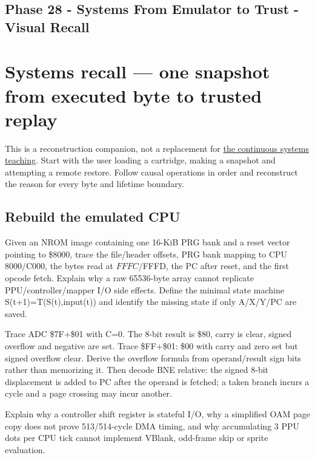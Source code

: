 \hypertarget{appendix-11f73b337e37}{}
\section*{Phase 28 - Systems From Emulator to Trust - Visual Recall}
\chapter{Systems recall --- one snapshot from executed byte to trusted replay}\label{appendix-11f73b337e37-systems-recall-one-snapshot-from-executed-byte-to-trusted-replay}

This is a reconstruction companion, not a replacement for \href{Continuous\%20Notes/Computing\%20Foundations\%20-\%20From\%20Bits\%20to\%20C++\%20and\%20Systems\%20APIs}{the continuous systems teaching}. Start with the user loading a cartridge, making a snapshot and attempting a remote restore. Follow causal operations in order and reconstruct the reason for every byte and lifetime boundary.

\section{Rebuild the emulated CPU}\label{appendix-11f73b337e37-rebuild-the-emulated-cpu}

Given an NROM image containing one 16-KiB PRG bank and a reset vector pointing to \$8000, trace the file/header offsets, PRG bank mapping to CPU \(8000/\)C000, the bytes read at \(FFFC/\)FFFD, the PC after reset, and the first opcode fetch. Explain why a raw 65536-byte array cannot replicate PPU/controller/mapper I/O side effects. Define the minimal state machine S(t+1)=T(S(t),input(t)) and identify the missing state if only A/X/Y/PC are saved.

Trace ADC \$7F+\$01 with C=0. The 8-bit result is \$80, carry is clear, signed overflow and negative are set. Trace \$FF+\$01: \$00 with carry and zero set but signed overflow clear. Derive the overflow formula from operand/result sign bits rather than memorizing it. Then decode BNE relative: the signed 8-bit displacement is added to PC after the operand is fetched; a taken branch incurs a cycle and a page crossing may incur another.

Explain why a controller shift register is stateful I/O, why a simplified OAM page copy does not prove 513/514-cycle DMA timing, and why accumulating 3 PPU dots per CPU tick cannot implement VBlank, odd-frame skip or sprite evaluation.

